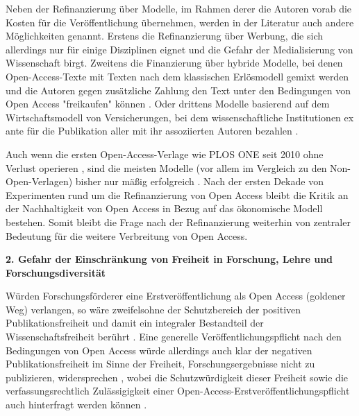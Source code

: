 Neben der Refinanzierung über Modelle, im Rahmen derer die Autoren vorab die Kosten für die Veröffentlichung übernehmen, werden in der Literatur auch andere Möglichkeiten genannt. Erstens die Refinanzierung über Werbung, die sich allerdings nur für einige Disziplinen \cite{Bjoerk_2004} eignet und die Gefahr der Medialisierung von Wissenschaft birgt. Zweitens die Finanzierung über hybride Modelle, bei denen Open-Access-Texte mit Texten nach dem klassischen Erlösmodell gemixt werden und die Autoren gegen zusätzliche Zahlung den Text unter den Bedingungen von Open Access "freikaufen" können \cite{Bjoerk_2012}. Oder drittens Modelle basierend auf dem Wirtschaftsmodell von Versicherungen, bei dem wissenschaftliche Institutionen ex ante für die Publikation aller mit ihr assoziierten Autoren bezahlen \cite[:63]{Mueller-Langer_2010}.

Auch wenn die ersten Open-Access-Verlage wie PLOS ONE seit 2010 ohne Verlust operieren \cite{Jerram_2010}, sind die meisten Modelle (vor allem im Vergleich zu den Non-Open-Verlagen) bisher nur mäßig erfolgreich \cite{Bjoerk_2012}. Nach der ersten Dekade von Experimenten rund um die Refinanzierung von Open Access bleibt die Kritik an der Nachhaltigkeit von Open Access in Bezug auf das ökonomische Modell bestehen. Somit bleibt die Frage nach der Refinanzierung weiterhin von zentraler Bedeutung für die weitere Verbreitung von Open Access.

\textbf{2. Gefahr der Einschränkung von Freiheit in Forschung, Lehre und Forschungsdiversität}

Würden Forschungsförderer eine Erstveröffentlichung als Open Access (goldener Weg) verlangen, so wäre zweifelsohne der Schutzbereich der positiven Publikationsfreiheit und damit ein integraler Bestandteil der Wissenschaftsfreiheit berührt \cite[:191]{Fehling_2014} \cite{Peukert_2013}. Eine generelle Veröffentlichungspflicht nach den Bedingungen von Open Access würde allerdings auch klar der negativen Publikationsfreiheit im Sinne der Freiheit, Forschungsergebnisse nicht zu publizieren, widersprechen \cite[:192]{Fehling_2014}, wobei die Schutzwürdigkeit dieser Freiheit sowie die verfassungsrechtlich Zulässigigkeit einer Open-Access-Erstveröffentlichungspflicht auch hinterfragt werden können \cite[:192]{Fehling_2014} \cite{Peukert_2013}.

